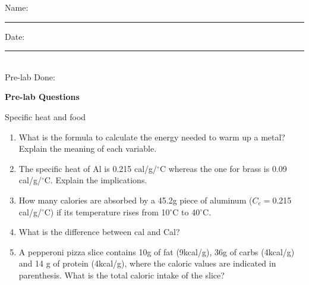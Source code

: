\documentclass[main.tex]{subfiles}
\begin{document}
\newpage
\setdoublesep{0.35700 em}  %
\setatomsep{1.78500 em}    %
\setbondoffset{0.18265 em} %
\newcommand{\bondwidth}{0.06642 em} %
\setbondstyle{line width = \bondwidth}

 





\begin{multicols}{2}
\begin{tcolorbox}[enhanced jigsaw,breakable,size=title,
colback=mybrown!05,colframe=black,fonttitle=\bfseries,
title=STUDENT INFO,pad at break=1mm, break at=15cm/0pt ]
\vspace{0.2cm}
\noindent Name: \rule{5cm}{0.4pt}Date:\rule{1cm}{0.4pt}\\
Pre-lab Done: \quad
\end{tcolorbox}
\end{multicols}
\hfill
\vspace{0.2cm}
\begin{center}
{\large \bfseries 
Pre-lab Questions 
\par
\Huge
Specific heat and food
\\[5pt] \par}
\vspace{0.2cm}
\end{center}
\par
\noindent
\uline{  \hfill \normalsize \hfill       }









\begin{enumerate}
\item What is the formula to calculate the energy needed to warm up a metal? Explain the meaning of each variable.
\vspace{3cm}


\item The specific heat of Al is 0.215 cal/g/$^\circ$C whereas the one for brass is 0.09 cal/g/$^\circ$C. Explain the implications.
\vspace{3cm}

\item How many calories are absorbed by a 45.2g piece of aluminum ($C_e=$0.215 cal/g/$^\circ$C)
if its temperature rises from 10$^\circ$C to 40$^\circ$C.
\vspace{3cm}

\item What is the difference between cal and Cal?
\vspace{3cm}

\item A pepperoni pizza slice contains 10g of fat (9kcal/g), 36g of carbs (4kcal/g) and 14 g of protein (4kcal/g), where the caloric values are indicated in parenthesis. What is the total caloric intake of the slice? 

\end{enumerate}
\end{document}
